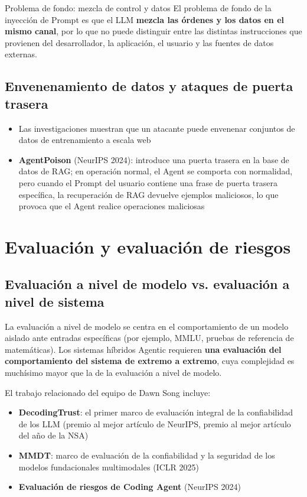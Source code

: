 \documentclass[a4paper]{article}
\begin{document}
\begin{warningbox}{Problema de fondo: mezcla de control y datos}
El problema de fondo de la inyección de Prompt es que el LLM \textbf{mezcla las órdenes y los datos en el mismo canal}, por lo que no puede distinguir entre las distintas instrucciones que provienen del desarrollador, la aplicación, el usuario y las fuentes de datos externas.
\end{warningbox}

\subsection{Envenenamiento de datos y ataques de puerta trasera}

\begin{itemize}
    \item Las investigaciones muestran que un atacante puede envenenar conjuntos de datos de entrenamiento a escala web
    \item \textbf{AgentPoison} (NeurIPS 2024): introduce una puerta trasera en la base de datos de RAG; en operación normal, el Agent se comporta con normalidad, pero cuando el Prompt del usuario contiene una frase de puerta trasera específica, la recuperación de RAG devuelve ejemplos maliciosos, lo que provoca que el Agent realice operaciones maliciosas
\end{itemize}
\section{Evaluación y evaluación de riesgos}

\subsection{Evaluación a nivel de modelo vs. evaluación a nivel de sistema}

La evaluación a nivel de modelo se centra en el comportamiento de un modelo aislado ante entradas específicas (por ejemplo, MMLU, pruebas de referencia de matemáticas). Los sistemas híbridos Agentic requieren \textbf{una evaluación del comportamiento del sistema de extremo a extremo}, cuya complejidad es muchísimo mayor que la de la evaluación a nivel de modelo.

El trabajo relacionado del equipo de Dawn Song incluye:
\begin{itemize}
    \item \textbf{DecodingTrust}: el primer marco de evaluación integral de la confiabilidad de los LLM (premio al mejor artículo de NeurIPS, premio al mejor artículo del año de la NSA)
    \item \textbf{MMDT}: marco de evaluación de la confiabilidad y la seguridad de los modelos fundacionales multimodales (ICLR 2025)
    \item \textbf{Evaluación de riesgos de Coding Agent} (NeurIPS 2024)
\end{itemize}
\end{document}

